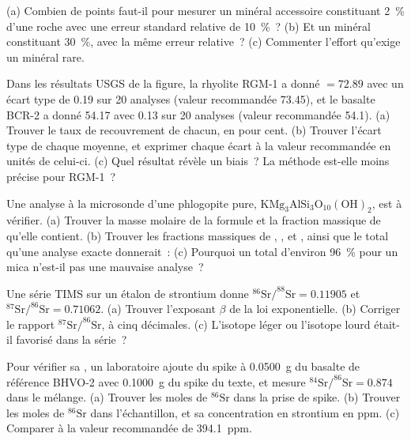\begin{exercise}[$\star\star$]\label{exo:b2:field-lab-methods-2:5}
(a) Combien de points faut-il pour mesurer un minéral accessoire constituant \qty{2}{\percent} d'une roche
avec une erreur standard relative de \qty{10}{\percent}~? (b) Et un minéral constituant \qty{30}{\percent},
avec la même erreur relative~? (c) Commenter l'effort qu'exige un minéral rare.
\end{exercise}

\begin{exercise}[$\star\star$]\label{exo:b2:field-lab-methods-2:6}
Dans les résultats USGS de la figure, la rhyolite RGM-1 a donné  $= 72.89$ avec un écart type
de 0.19 sur 20 analyses (valeur recommandée 73.45), et le basalte BCR-2 a donné 54.17 avec 0.13 sur
20 analyses (valeur recommandée 54.1). (a) Trouver le taux de recouvrement de chacun, en pour cent. (b) Trouver l'écart type
de chaque moyenne, et exprimer chaque écart à la valeur recommandée en unités de celui-ci.
(c) Quel résultat révèle un biais~? La méthode est-elle moins précise pour RGM-1~?
\end{exercise}

\begin{exercise}[$\star\star$]\label{exo:b2:field-lab-methods-2:7}
Une analyse à la microsonde d'une phlogopite pure, $\mathrm{KMg_3AlSi_3O_{10}(OH)_2}$, est à vérifier.
(a) Trouver la masse molaire de la formule et la fraction massique de  qu'elle contient. (b) Trouver les
fractions massiques de , ,  et , ainsi que le total qu'une analyse exacte donnerait~:
(c) Pourquoi un total d'environ \qty{96}{\percent} pour un mica n'est-il pas une mauvaise analyse~?
\end{exercise}

\begin{exercise}[$\star\star$]\label{exo:b2:field-lab-methods-2:8}
Une série TIMS sur un étalon de strontium donne $^{86}\mathrm{Sr}/^{88}\mathrm{Sr} = 0.11905$ et
$^{87}\mathrm{Sr}/^{86}\mathrm{Sr} = 0.71062$. (a) Trouver l'exposant $\beta$ de la loi exponentielle.
(b) Corriger le rapport $^{87}\mathrm{Sr}/^{86}\mathrm{Sr}$, à cinq décimales. (c) L'isotope léger ou
l'isotope lourd était-il favorisé dans la série~?
\end{exercise}

\begin{exercise}[$\star\star$]\label{exo:b2:field-lab-methods-2:9}
Pour vérifier sa , un laboratoire ajoute du spike à \qty{0.0500}{g} du basalte de référence BHVO-2
avec \qty{0.1000}{g} du spike du texte, et mesure $^{84}\mathrm{Sr}/^{86}\mathrm{Sr} =
0.874$ dans le mélange. (a) Trouver les moles de $^{86}\mathrm{Sr}$ dans la prise de spike. (b) Trouver les
moles de $^{86}\mathrm{Sr}$ dans l'échantillon, et sa concentration en strontium en ppm. (c) Comparer à
la valeur recommandée de \qty{394.1}{ppm}.
\end{exercise}

